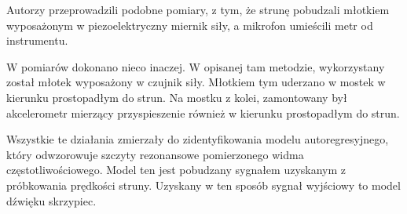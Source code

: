 Autorzy \cite{bowed_4} przeprowadzili podobne pomiary, z tym, że strunę pobudzali młotkiem wyposażonym w piezoelektryczny miernik siły, a mikrofon umieścili metr od instrumentu.

W \cite{bowed_2} pomiarów dokonano nieco inaczej. W opisanej tam metodzie, wykorzystany został młotek wyposażony w czujnik siły. Młotkiem tym uderzano w mostek w kierunku prostopadłym do strun. Na mostku z kolei, zamontowany był akcelerometr mierzący przyspieszenie również w kierunku prostopadłym do strun.

Wszystkie te działania zmierzały do zidentyfikowania modelu autoregresyjnego, który odwzorowuje szczyty rezonansowe pomierzonego widma częstotliwościowego. Model ten jest pobudzany sygnałem uzyskanym z próbkowania prędkości struny. Uzyskany w ten sposób sygnał wyjściowy to model dźwięku skrzypiec.


